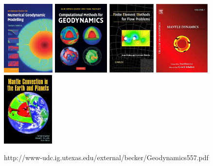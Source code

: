 \documentclass[a4paper]{article}
\begin{document}
\begin{center}
\includegraphics[height=3.74cm]{images/literature/gerya_book}
\includegraphics[height=3.74cm]{images/literature/tackley_book}
\includegraphics[height=3.74cm]{images/literature/donea_huerta_book}
\includegraphics[height=3.74cm]{images/literature/bercovici_book}
\includegraphics[height=3.74cm]{images/literature/sto_book}\\
\end{center}

http://www-udc.ig.utexas.edu/external/becker/Geodynamics557.pdf
\end{document}
